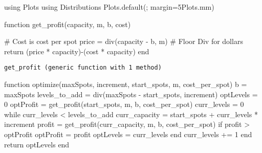 \documentclass[
  letterpaper,
  DIV=11,
  numbers=noendperiod]{scrartcl}
\newenvironment{Shaded}{\begin{snugshade}}{\end{snugshade}}
\newcommand{\BuiltInTok}[1]{\textcolor[rgb]{0.00,0.23,0.31}{#1}}
\newcommand{\CommentTok}[1]{\textcolor[rgb]{0.37,0.37,0.37}{#1}}
\newcommand{\ControlFlowTok}[1]{\textcolor[rgb]{0.00,0.23,0.31}{#1}}
\newcommand{\FloatTok}[1]{\textcolor[rgb]{0.68,0.00,0.00}{#1}}
\newcommand{\FunctionTok}[1]{\textcolor[rgb]{0.28,0.35,0.67}{#1}}
\newcommand{\ImportTok}[1]{\textcolor[rgb]{0.00,0.46,0.62}{#1}}
\newcommand{\KeywordTok}[1]{\textcolor[rgb]{0.00,0.23,0.31}{#1}}
\newcommand{\NormalTok}[1]{\textcolor[rgb]{0.00,0.23,0.31}{#1}}
\newcommand{\OperatorTok}[1]{\textcolor[rgb]{0.37,0.37,0.37}{#1}}
\begin{document}
\begin{Shaded}
\begin{Highlighting}[]
\ImportTok{using} \BuiltInTok{Plots}
\ImportTok{using} \BuiltInTok{Distributions}
\NormalTok{Plots.}\FunctionTok{default}\NormalTok{(; margin}\OperatorTok{=}\FloatTok{5}\NormalTok{Plots.mm)}
\end{Highlighting}
\end{Shaded}

\begin{Shaded}
\begin{Highlighting}[]
\KeywordTok{function} \FunctionTok{get\_profit}\NormalTok{(capacity, m, b, cost)}

    \CommentTok{\# Cost is cost per spot }
\NormalTok{    price }\OperatorTok{=} \FunctionTok{div}\NormalTok{(capacity }\OperatorTok{{-}}\NormalTok{ b, m) }\CommentTok{\# Floor Div for dollars}
    \ControlFlowTok{return}\NormalTok{ (price }\OperatorTok{*}\NormalTok{ capacity)}\FunctionTok{{-}}\NormalTok{(cost }\OperatorTok{*}\NormalTok{ capacity)}
\KeywordTok{end}
\end{Highlighting}
\end{Shaded}

\begin{verbatim}
get_profit (generic function with 1 method)
\end{verbatim}

\begin{Shaded}
\begin{Highlighting}[]
\KeywordTok{function} \FunctionTok{optimize}\NormalTok{(maxSpots, increment, start\_spots, m, cost\_per\_spot)}
\NormalTok{    b }\OperatorTok{=}\NormalTok{ maxSpots}
\NormalTok{    levels\_to\_add }\OperatorTok{=} \FunctionTok{div}\NormalTok{(maxSpots }\OperatorTok{{-}}\NormalTok{ start\_spots, increment)}
\NormalTok{    optLevels }\OperatorTok{=} \FloatTok{0} 
\NormalTok{    optProfit }\OperatorTok{=} \FunctionTok{get\_profit}\NormalTok{(start\_spots, m, b, cost\_per\_spot)}
\NormalTok{    curr\_levels }\OperatorTok{=} \FloatTok{0}
    \ControlFlowTok{while}\NormalTok{ curr\_levels }\OperatorTok{\textless{}}\NormalTok{ levels\_to\_add}
\NormalTok{        curr\_capacity }\OperatorTok{=}\NormalTok{ start\_spots }\OperatorTok{+}\NormalTok{ curr\_levels }\OperatorTok{*}\NormalTok{ increment}
\NormalTok{        profit }\OperatorTok{=} \FunctionTok{get\_profit}\NormalTok{(curr\_capacity, m, b, cost\_per\_spot)}
        \ControlFlowTok{if}\NormalTok{ profit }\OperatorTok{\textgreater{}}\NormalTok{ optProfit}
\NormalTok{            optProfit }\OperatorTok{=}\NormalTok{ profit}
\NormalTok{            optLevels }\OperatorTok{=}\NormalTok{ curr\_levels}
        \ControlFlowTok{end}
\NormalTok{        curr\_levels }\OperatorTok{+=} \FloatTok{1}
    \ControlFlowTok{end}
    \ControlFlowTok{return}\NormalTok{ optLevels}
\KeywordTok{end}
\end{Highlighting}
\end{Shaded}
\end{document}
